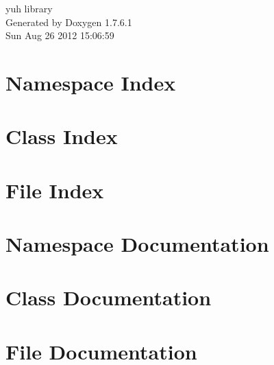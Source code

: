 \documentclass[a4paper]{book}
\begin{document}
\hypersetup{pageanchor=false,citecolor=blue}
\begin{titlepage}
\vspace*{7cm}
\begin{center}
{\Large yuh library }\\
\vspace*{1cm}
{\large \-Generated by Doxygen 1.7.6.1}\\
\vspace*{0.5cm}
{\small Sun Aug 26 2012 15:06:59}\\
\end{center}
\end{titlepage}
\clearemptydoublepage
{}
\tableofcontents
\clearemptydoublepage
{}
\hypersetup{pageanchor=true,citecolor=blue}
\chapter{\-Namespace \-Index}

\chapter{\-Class \-Index}

\chapter{\-File \-Index}

\chapter{\-Namespace \-Documentation}




\chapter{\-Class \-Documentation}














\chapter{\-File \-Documentation}













\printindex
\end{document}
